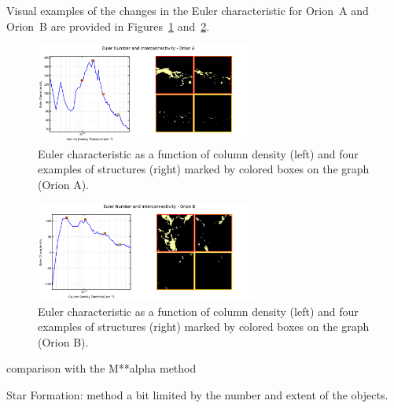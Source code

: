 Visual examples of the changes in the Euler characteristic for Orion~A and Orion~B are provided in Figures~\ref{fig:Euler_Orion_A} and~\ref{fig:Euler_Orion_B}.

\begin{figure}[t]
    \centering
    \includegraphics[width=0.65\textwidth]{figures/euler_Orion_A.png}
    \caption{Euler characteristic as a function of column density (left) and four examples of structures (right) marked by colored boxes on the graph (Orion A).}
    \label{fig:Euler_Orion_A}
\end{figure}

\begin{figure}[t]
    \centering
    \includegraphics[width=0.65\textwidth]{figures/euler_Orion_B.png}
    \caption{Euler characteristic as a function of column density (left) and four examples of structures (right) marked by colored boxes on the graph (Orion B).}
    \label{fig:Euler_Orion_B}
\end{figure}






comparison with the M**alpha method

Star Formation: method a bit limited by the number and extent of the objects.